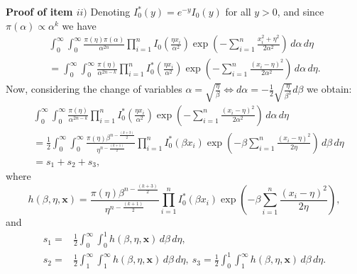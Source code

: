 \documentclass[12pt]{interact}
\theoremstyle{plain}%
\theoremstyle{definition}
\theoremstyle{remark}
\begin{document}
\begin{appendix}
\noindent\textbf{Proof of item $ii)$} Denoting $I_0^*\left(y\right) = e^{-y} I_0\left(y\right)$ for all $y>0$, and since $\pi(\alpha)\propto \alpha^k$ we have
\begin{equation*}
\begin{aligned}
\int_0^\infty \int_0^\infty \frac{\pi(\eta)\pi(\alpha)}{\alpha^{2n}}\prod_{i=1}^{n}I_0\left( \frac{\eta x_i}{\alpha^2} \right) \exp\left( -\sum_{i=1}^{n}\frac{x_i^2 + \eta^2}{2\alpha^2} \right)\, d\alpha\, d\eta\\
=\int_0^\infty \int_0^\infty \frac{\pi(\eta)}{\alpha^{2n-k}}\prod_{i=1}^{n}I_0^*\left( \frac{\eta x_i}{\alpha^2} \right) \exp\left( -\sum_{i=1}^{n}\frac{(x_i - \eta)^2}{2\alpha^2} \right)\, d\alpha\, d\eta.
\end{aligned}
\end{equation*}
Now, considering the change of variables  $\alpha = \sqrt{\frac{\eta}{\beta}} \Leftrightarrow d\alpha = - \frac{1}{2}\sqrt{\frac{\eta}{\beta^3}}d\beta$ we obtain:
\begin{equation*}
\begin{aligned}
&\int_0^\infty \int_0^\infty \frac{\pi(\eta)}{\alpha^{2n-k}}\prod_{i=1}^{n}I_0^*\left( \frac{\eta x_i}{\alpha^2} \right) \exp\left( -\sum_{i=1}^{n}\frac{(x_i - \eta)^2}{2\alpha^2} \right)\, d\alpha\, d\eta\\
&= \frac{1}{2}\int_0^\infty \int_0^\infty \frac{\pi(\eta)\beta^{n-\frac{(k+3)}{2}}}{\eta^{n-\frac{(k+1)}{2}}}\prod_{i=1}^{n}I_0^*\left(\beta x_i \right) \exp\left( -\beta\sum_{i=1}^{n}\frac{(x_i - \eta)^2}{2\eta} \right)\, d\beta\, d\eta\\
&= s_1 + s_2 + s_3,
\end{aligned}
\end{equation*}
where
\begin{equation*} h(\beta,\eta,\boldsymbol{x}) = \frac{\pi(\eta)\beta^{n-\frac{(k+3)}{2}}}{\eta^{n-\frac{(k+1)}{2}}}\prod_{i=1}^{n}I_0^*\left(\beta x_i \right) \exp\left( -\beta\sum_{i=1}^{n}\frac{(x_i - \eta)^2}{2\eta} \right),
\end{equation*}
and
\begin{equation*}
\begin{aligned}
s_1 =& \frac{1}{2}\int_0^\infty  
 \int_0^1 h(\beta,\eta,\boldsymbol{x}) \, d\beta\, d\eta,
\\ s_2 =& \frac{1}{2}\int_1^\infty  
 \int_1^\infty h(\beta,\eta,\boldsymbol{x}) \, d\beta\, d\eta ,\ s_3 = \frac{1}{2}\int_0^1  
 \int_1^\infty h(\beta,\eta,\boldsymbol{x}) \, d\beta\, d\eta.
\end{aligned}
\end{equation*}


\end{appendix}
\end{document}

